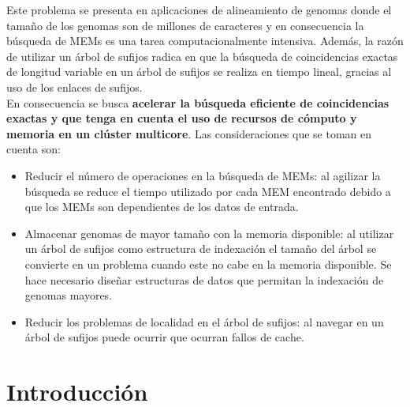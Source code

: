 \documentclass[12pt,a4paper]{article}
\begin{document}
\indent
Este problema se presenta en aplicaciones de alineamiento de genomas donde el tama\~no de los genomas son de millones de caracteres y en consecuencia la búsqueda de MEMs es una tarea computacionalmente intensiva. Además, la razón de utilizar un árbol de sufijos radica en que la búsqueda de coincidencias exactas de longitud variable en un árbol de 
sufijos se realiza en tiempo lineal, gracias al uso de los enlaces de sufijos.\\
\indent
En consecuencia se busca \textbf{acelerar la búsqueda eficiente de 
coincidencias exactas y que tenga en cuenta el uso de recursos de cómputo y
memoria en un clúster multicore}. Las consideraciones que se toman en cuenta son:
\begin{itemize}
\item Reducir el número de operaciones en la búsqueda de MEMs: al agilizar la búsqueda se reduce el tiempo utilizado por cada MEM encontrado debido a que los MEMs son dependientes de los datos de entrada.
\item Almacenar genomas de mayor tamaño con la memoria disponible: al utilizar un árbol de sufijos como estructura de indexación el tamaño del árbol se convierte en un problema cuando este no cabe en la memoria disponible. Se hace necesario diseñar estructuras de datos que permitan la indexación de genomas mayores.
\item Reducir los problemas de localidad en el árbol de sufijos: al navegar en un árbol de sufijos puede ocurrir que ocurran fallos de cache.
\end{itemize}
\section{Introducción} 
\end{document}
